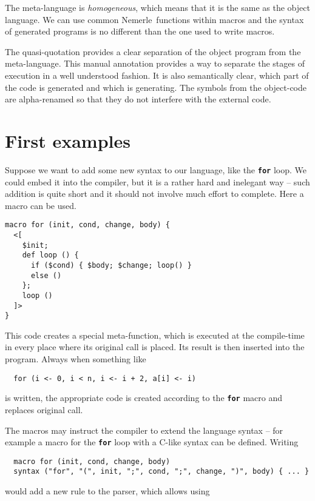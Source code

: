 \documentclass{llncs}
\newcommand{\nem}[0]{Nemerle}
\newcommand{\kw}[1]{{\tt \bf #1}}
\begin{document}
The meta-language is \emph{homogeneous}, which means that it is the same as the 
object language. We can use common \nem\ functions within macros and the syntax 
of generated programs is no different than the one used to write macros.

The quasi-quotation provides a clear separation of the object program from 
the meta-language. This manual annotation provides a way to separate the stages
of execution in a well understood fashion. It is also semantically clear, which 
part of the code is generated and which is generating. The symbols from the 
object-code are alpha-renamed so that they do not interfere with the external code. 

\section{First examples}
Suppose we want to add some new syntax to our language, like the \kw{for} loop.
We could embed it into the compiler, but it is a rather hard and inelegant way -- such 
addition is quite short and it should not involve much effort to complete. 
Here a macro can be used.

\begin{verbatim}
macro for (init, cond, change, body) {
  <[ 
    $init;
    def loop () {
      if ($cond) { $body; $change; loop() } 
      else () 
    }; 
    loop ()
  ]>
}
\end{verbatim}

This code creates a special meta-function, which is executed at the compile-time
in every place where its original call is placed. Its result is then inserted 
into the program. Always when something like

\begin{verbatim}
  for (i <- 0, i < n, i <- i + 2, a[i] <- i)
\end{verbatim}

\noindent
is written, the appropriate code is created according to the \kw{for} macro and 
replaces original call.

The macros may instruct the compiler to extend the language syntax -- for example 
a macro for the \kw{for} loop with a C-like syntax can be defined. Writing

\begin{verbatim}
  macro for (init, cond, change, body) 
  syntax ("for", "(", init, ";", cond, ";", change, ")", body) { ... }
\end{verbatim}

\noindent
would add a new rule to the parser, which allows using
\end{document}
